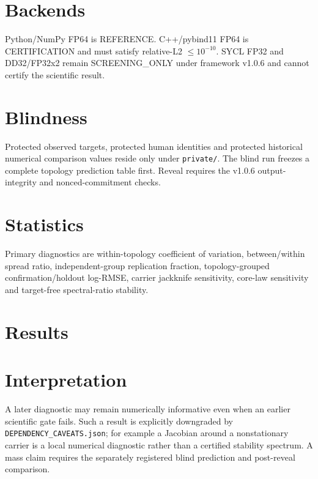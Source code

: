 \documentclass[11pt]{article}
\begin{document}
\section{Backends}
Python/NumPy FP64 is REFERENCE. C++/pybind11 FP64 is CERTIFICATION and must satisfy relative-L2 \(\le10^{-10}\). SYCL FP32 and DD32/FP32x2 remain SCREENING\_ONLY under framework v1.0.6 and cannot certify the scientific result.

\section{Blindness}
Protected observed targets, protected human identities and protected historical numerical comparison values reside only under \texttt{private/}. The blind run freezes a complete topology prediction table first. Reveal requires the v1.0.6 output-integrity and nonced-commitment checks.

\section{Statistics}
Primary diagnostics are within-topology coefficient of variation, between/within spread ratio, independent-group replication fraction, topology-grouped confirmation/holdout log-RMSE, carrier jackknife sensitivity, core-law sensitivity and target-free spectral-ratio stability.

\section{Results}

\section{Interpretation}
A later diagnostic may remain numerically informative even when an earlier scientific gate fails. Such a result is explicitly downgraded by \texttt{DEPENDENCY\_CAVEATS.json}; for example a Jacobian around a nonstationary carrier is a local numerical diagnostic rather than a certified stability spectrum. A mass claim requires the separately registered blind prediction and post-reveal comparison.

\end{document}
